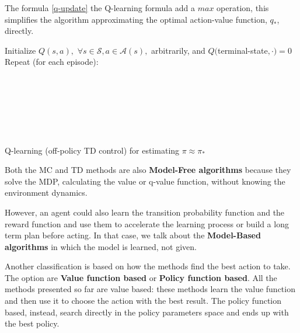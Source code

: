 The formula \ref{q-update} the Q-learning formula add a $max$ operation, this simplifies the algorithm approximating the optimal action-value function, $q_*$, directly.


    \begin{algorithm}[H]
        \begin{algorithmic}
          \State Initialize $Q(s, a),$ $ \forall s \in \mathcal{S}, a \in \mathcal{A}(s),$ arbitrarily, and $Q($terminal-state$, \cdot)=0$
          \State Repeat (for each episode):
          \\
          \\
		  \\
          \\
          \\
          \\
          \\
        \end{algorithmic}
    \caption{Q-learning (off-policy TD control) for estimating $\pi \approx \pi_{*}$}
    \label{alg:q-learning}
    \end{algorithm}


Both the MC and TD methods are also \textbf{Model-Free algorithms} because they solve the MDP, calculating the value or q-value function, without knowing the environment dynamics. 

However, an agent could also learn the transition probability function and the reward function and use them to accelerate the learning process or build a long term plan before acting. 
In that case, we talk about the \textbf{Model-Based algorithms} in which the model is learned, not given.

Another classification is based on how the methods find the best action to take.
The option are \textbf{Value function based} or \textbf{Policy function based}.
All the methods presented so far are value based: these methods learn the value function and then use it to choose the action with the best result.
The policy function based, instead, search directly in the policy parameters space and ends up with the best policy.

